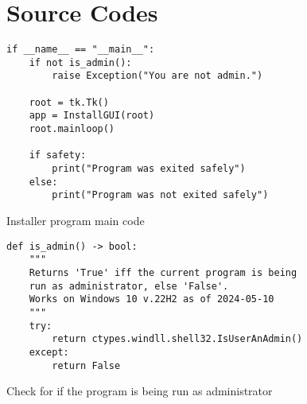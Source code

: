 \chapter{Source Codes}



\begin{listing}[!ht]
    \begin{verbatim}
if __name__ == "__main__":
    if not is_admin():
        raise Exception("You are not admin.")
        
    root = tk.Tk()
    app = InstallGUI(root)
    root.mainloop()
    
    if safety:
        print("Program was exited safely")
    else:
        print("Program was not exited safely")
    \end{verbatim}
    \caption{Installer program main code}
    \label{sc:if_name_main_c1}
\end{listing}


\newpage
\begin{listing}[!ht]
    \begin{verbatim}
def is_admin() -> bool:
    """
    Returns 'True' iff the current program is being 
    run as administrator, else 'False'. 
    Works on Windows 10 v.22H2 as of 2024-05-10
    """
    try:
        return ctypes.windll.shell32.IsUserAnAdmin()
    except:
        return False
    \end{verbatim}
    \caption{Check for if the program is being run as administrator}
    \label{sc:admin_checker}
\end{listing}


